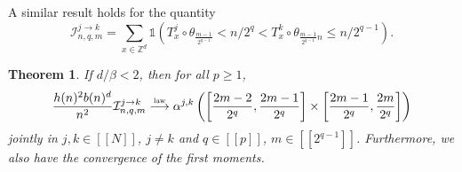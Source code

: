 \documentclass[10pt,a4paper]{amsart}
\newcommand{\1}{\mathds{1}}
\newcommand{\ZZ}{\mathbb Z}
\newcommand{\distribution}{\stackrel{\scaleto{\mathrm{law}}{4pt}}{\longrightarrow}}
\newtheorem{theorem}{Theorem}
\numberwithin{equation}{section}
\begin{document}
A similar result holds for the quantity 
\begin{equation*}
    \mathcal I_{n,q,m}^{j\rightarrow k}=\sum_{x\in\ZZ^d}\1\left(T_x^j\circ\theta_{\frac{m-1}{2^{q-1}}}<n/2^q<T_x^k\circ\theta_{\frac{m-1}{2^{q-1}}n}\le n/2^{q-1}\right).
\end{equation*} 

\begin{theorem}
\label{theorem:joint convergence of the I_(n,q,m)^(j->k)}
    If $d/\beta<2$, then for all $p\ge1$,
    \begin{equation*}
        \frac{h(n)^2b(n)^d}{n^2}\mathcal I_{n,q,m}^{j\rightarrow k}\distribution\alpha^{j,k}\left(\left[\frac{2m-2}{2^q},\frac{2m-1}{2^q}\right]\times\left[\frac{2m-1}{2^q},\frac{2m}{2^q}\right]\right)
    \end{equation*}
    jointly in $j,k\in[\![N]\!]$, $j\ne k$ and $q\in[\![p]\!]$, $m\in[\![2^{q-1}]\!]$. Furthermore, we also have the convergence of the first moments.
\end{theorem}
\end{document}
